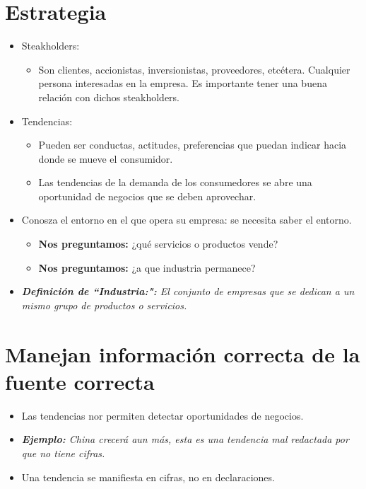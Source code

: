 \section{Estrategia}
\begin{itemize}
    \item Steakholders:
        \begin{itemize}
            \item Son clientes, accionistas, inversionistas, proveedores, etcétera. Cualquier persona interesadas en la empresa. Es importante tener una buena relación con dichos steakholders.
        \end{itemize}
    
    \item Tendencias: 
        \begin{itemize}
            \item Pueden ser conductas, actitudes, preferencias que puedan indicar hacia donde se mueve el consumidor.
            \item Las tendencias de la demanda de los consumedores se abre una oportunidad de negocios que se deben aprovechar.
        \end{itemize}
    
    \item Conosza el entorno en el que opera su empresa: se necesita saber el entorno.
        \begin{itemize}
            \item \textbf{Nos preguntamos:} ¿qué servicios o productos vende?
            \item \textbf{Nos preguntamos:} ¿a que industria permanece?
        \end{itemize}
        
    \item \emph{\textbf{Definición de ``Industria:":} El conjunto de empresas que se dedican a un mismo grupo de productos o servicios.}
\end{itemize}


\section{Manejan información correcta de la fuente correcta}
\begin{itemize}
    \item Las tendencias nor permiten detectar oportunidades de negocios.
    \item \emph{\textbf{Ejemplo: }China crecerá aun más, esta es una tendencia mal redactada por que no tiene cifras.}
    \item Una tendencia se manifiesta en cifras, no en declaraciones.
\end{itemize}
